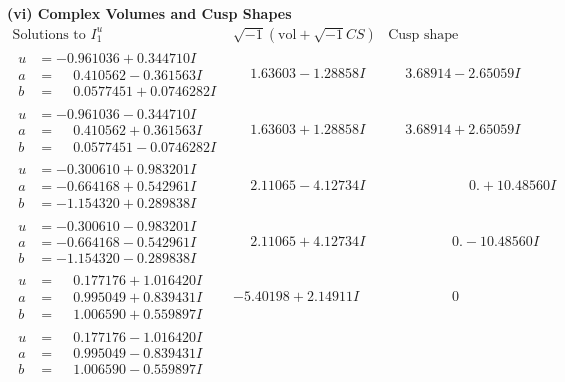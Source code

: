\documentclass[1p]{elsarticle_modified}
\theoremstyle{definition}
\newcommand{\I}{\sqrt{-1}}
\begin{document}
\newpage\flushleft \textbf{(vi) Complex Volumes and Cusp Shapes}
$$\begin{array}{c|c|c}  
\text{Solutions to }I^u_{1}& \I (\text{vol} + \sqrt{-1}CS) & \text{Cusp shape}\\
 \hline 
\begin{aligned}
u &= -0.961036 + 0.344710 I \\
a &= \phantom{-}0.410562 - 0.361563 I \\
b &= \phantom{-}0.0577451 + 0.0746282 I\end{aligned}
 & \phantom{-}1.63603 - 1.28858 I & \phantom{-}3.68914 - 2.65059 I \\ \hline\begin{aligned}
u &= -0.961036 - 0.344710 I \\
a &= \phantom{-}0.410562 + 0.361563 I \\
b &= \phantom{-}0.0577451 - 0.0746282 I\end{aligned}
 & \phantom{-}1.63603 + 1.28858 I & \phantom{-}3.68914 + 2.65059 I \\ \hline\begin{aligned}
u &= -0.300610 + 0.983201 I \\
a &= -0.664168 + 0.542961 I \\
b &= -1.154320 + 0.289838 I\end{aligned}
 & \phantom{-}2.11065 - 4.12734 I & \phantom{-0.000000 -}0. + 10.48560 I \\ \hline\begin{aligned}
u &= -0.300610 - 0.983201 I \\
a &= -0.664168 - 0.542961 I \\
b &= -1.154320 - 0.289838 I\end{aligned}
 & \phantom{-}2.11065 + 4.12734 I & \phantom{-0.000000 } 0. - 10.48560 I \\ \hline\begin{aligned}
u &= \phantom{-}0.177176 + 1.016420 I \\
a &= \phantom{-}0.995049 + 0.839431 I \\
b &= \phantom{-}1.006590 + 0.559897 I\end{aligned}
 & -5.40198 + 2.14911 I & \phantom{-0.000000 } 0 \\ \hline\begin{aligned}
u &= \phantom{-}0.177176 - 1.016420 I \\
a &= \phantom{-}0.995049 - 0.839431 I \\
b &= \phantom{-}1.006590 - 0.559897 I\end{aligned}

\end{array}$$
\end{document}
